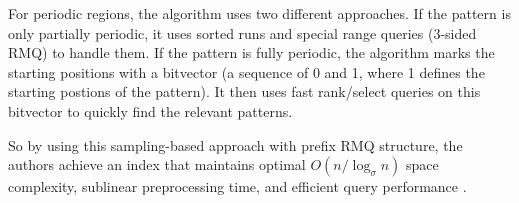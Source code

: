 For periodic regions, the algorithm uses two different approaches. If the pattern is only partially periodic, it uses sorted runs and special range queries (3-sided RMQ) to handle them. If the pattern is fully periodic, the algorithm marks the starting positions with a bitvector (a sequence of 0 and 1, where 1 defines the starting postions of the pattern). It then uses fast rank/select queries on this bitvector to quickly find the relevant patterns.

So by using this sampling-based approach with prefix RMQ structure, the authors achieve an index that maintains optimal \( O(n / \log_{\sigma} n) \) space complexity, sublinear preprocessing time, and efficient query performance \cite{10756041}.
